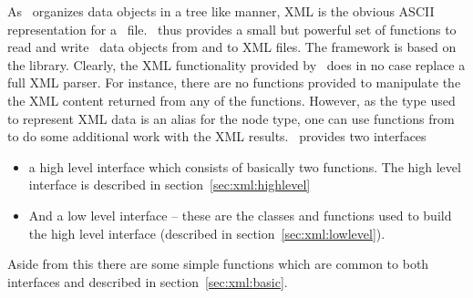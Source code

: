 
As \nexus\ organizes data objects in a tree like manner, XML is the obvious ASCII
representation for a \nexus\ file.
\libpniio\ thus provides a small but powerful set of functions to read and write 
\nexus\ data objects from and to XML files. The framework is based on the 
 library. Clearly, the XML functionality provided 
by \libpniio\ does in no case replace a full XML parser. For instance, there are
no functions provided to manipulate the the XML content returned from 
any of the functions. However, as the  type used to represent 
XML data is an alias for the  node type, one can use
functions from  to do some additional work with the
XML results.
\libpniio\ provides two interfaces\
\begin{itemize}
\item a high level interface which consists of basically two functions. The high
level interface is described in section~\ref{sec:xml:highlevel}
\item And a low level interface -- these are the classes and functions used to
build the high level interface (described in section~\ref{sec:xml:lowlevel}).
\end{itemize}
Aside from this there are some simple functions which are common to both
interfaces and described in section~\ref{sec:xml:basic}.

